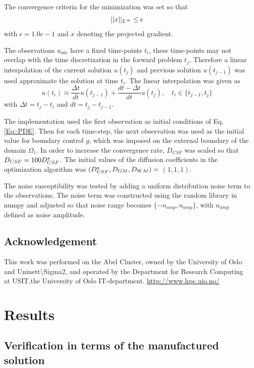 \documentclass[11pt,a4paper]{article}
\begin{document}
The convergence criteria for the minimization was set so that 
\begin{equation}
||x ||_{L\sp{\infty}} \leq \epsilon
\end{equation} 
with $\epsilon=1.0e-1$ and $x$ denoting the projected gradient. 

The observations $u_{obs}$ have a fixed time-points $t_i$, these time-points may not overlap with the time discretization in the forward problem $t_j$. Therefore a linear interpolation of the current solution $u(t_j)$ and previous solution $u(t_{j-1})$ was used approximate the solution at time $t_i$. The linear interpolation was given as  
\begin{equation}
\label{observation:interpolation}
u(t_i) \approx \frac{\Delta t}{dt} u(t_{j-1}) + \frac{dt - \Delta t }{dt} u(t_{j}), \quad t_i \in \lbrace t_{j-1}, t_j \rbrace
\end{equation}
with $\Delta t = t_j-t_i$ and $dt  = t_{j} - t_{j-1}$.


The implementation used the first observation as initial conditions of Eq.\ref{Eq::PDE}. Then for each time-step, the next observation was used as the initial value for boundary control $g$, which was imposed on the external boundary of the domain $\Omega_1$. In order to increase the convergence rate, $D_{CSF}$ was scaled so that $D_{CSF} = 100 D_{CSF}\sp{\star} $. The initial values of the diffusion coefficients in the optimization algorithm was $(D_{CSF}\sp{\star}, D_{GM}, D_{WM})=$  $(1, 1, 1)$. 

The noise susceptibility was tested by adding a uniform distribution noise term to the observations. The noise term was constructed using the random library in numpy and adjusted so that noise range becomes $\lbrace -n_{amp} , n_{amp} \rbrace $, with $n_{amp}$ defined as noise amplitude. 

\subsection{Acknowledgement}
This work was performed on the Abel Cluster, owned by the University of Oslo and Uninett\textbackslash Sigma2, and operated by the Department for Research Computing at USIT,the University of Oslo IT-department. \url{http://www.hpc.uio.no/} 


\section{Results}

\subsection{Verification in terms of the manufactured solution}
\end{document}
